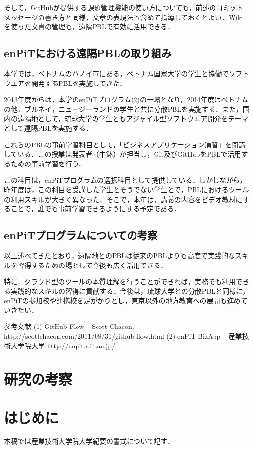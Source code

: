 \documentclass[a4j, 12Q, twocolumn, twoside]{jsarticle}
\begin{document}
そして，GitHubが提供する課題管理機能の使い方についても，前述のコミットメッセージの書き方と同様，文章の表現法も含めて指導しておくとよい．Wikiを使った文書の管理も，遠隔PBLで有効に活用できる．

\subsection{enPiTにおける遠隔PBLの取り組み}
本学では，ベトナムのハノイ市にある，ベトナム国家大学の学生と協働でソフトウエアを開発するPBLを実施してきた．

2013年度からは，本学のenPiTプログラム(2)の一環となり，2014年度はベトナムの他，ブルネイ，ニュージーランドの学生と共に分散PBLを実施する．また，国内の遠隔地として，琉球大学の学生ともアジャイル型ソフトウエア開発をテーマとして遠隔PBLを実施する．

これらのPBLの事前学習科目として，「ビジネスアプリケーション演習」を開講している．この授業は発表者（中鉢）が担当し，Git及びGitHubをPBLで活用するための事前学習を行う．

この科目は，enPiTプログラムの選択科目として提供している．しかしながら，昨年度は，この科目を受講した学生とそうでない学生とで，PBLにおけるツールの利用スキルが大きく異なった．そこで，本年は，講義の内容をビデオ教材にすることで，誰でも事前学習できるようにする予定である．

\subsection{enPiTプログラムについての考察}
以上述べてきたとおり，遠隔地とのPBLは従来のPBLよりも高度で実践的なスキルを習得するための場として今後も広く活用できる．

特に，クラウド型のツールの本質理解を行うことができれば，実務でも利用できる実践的なスキルの習得に貢献する．今後は，琉球大学との分散PBLと同様に，enPiTの参加校や連携校を足がかりとし，東京以外の地方教育への展開も進めていきたい．

参考文献
(1)	GitHub Flow – Scott Chacon, 
http://scottchacon.com/2011/08/31/github-flow.html
(2)	enPiT BizApp – 産業技術大学院大学
http://enpit.aiit.ac.jp/
\section{研究の考察}

\clearpage
\section{はじめに}
本稿では産業技術大学院大学紀要の書式について記す．
\end{document}
